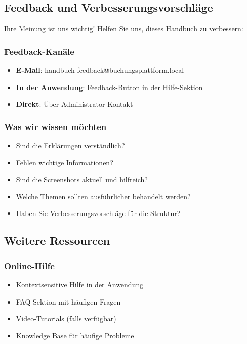 \subsection{Feedback und Verbesserungsvorschläge}

Ihre Meinung ist uns wichtig! Helfen Sie uns, dieses Handbuch zu verbessern:

\subsubsection{Feedback-Kanäle}

\begin{itemize}
    \item \textbf{E-Mail}: handbuch-feedback@buchungsplattform.local
    \item \textbf{In der Anwendung}: Feedback-Button in der Hilfe-Sektion
    \item \textbf{Direkt}: Über Administrator-Kontakt
\end{itemize}

\subsubsection{Was wir wissen möchten}

\begin{itemize}
    \item Sind die Erklärungen verständlich?
    \item Fehlen wichtige Informationen?
    \item Sind die Screenshots aktuell und hilfreich?
    \item Welche Themen sollten ausführlicher behandelt werden?
    \item Haben Sie Verbesserungsvorschläge für die Struktur?
\end{itemize}

\subsection{Weitere Ressourcen}

\subsubsection{Online-Hilfe}

\begin{itemize}
    \item Kontextsensitive Hilfe in der Anwendung
    \item FAQ-Sektion mit häufigen Fragen
    \item Video-Tutorials (falls verfügbar)
    \item Knowledge Base für häufige Probleme
\end{itemize}

